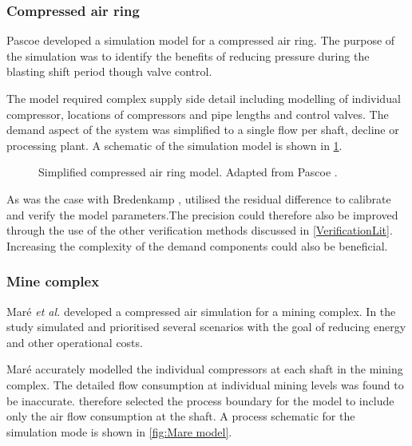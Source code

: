 \subsubsection{Compressed air ring}
Pascoe \cite{Pascoe2016Masters} developed a simulation model for a compressed air ring. The purpose of the simulation was to identify the benefits of reducing pressure during the blasting shift period though valve control.\par 
 The model required complex supply side detail including modelling of individual compressor, locations of compressors and pipe lengths and control valves. The demand aspect of the system was simplified to a single flow per shaft, decline or processing plant. A schematic of the simulation model is shown in \cref{fig:Pascoe model}.
 \par
\begin{figure}[h!]
	\centering
	\caption[Simplified compressed air ring model.]{Simplified compressed air ring model. Adapted from Pascoe \cite{Pascoe2016Masters}.}
	\label{fig:Pascoe model}
\end{figure}
As was the case with Bredenkamp \cite{Bredenkamp2013Masters}, \cite{Pascoe2016Masters} utilised the residual difference to calibrate and verify the model parameters.The precision could therefore also be improved through the use of the other verification methods discussed in \cref{VerificationLit}. Increasing the complexity of the demand components could also be beneficial.

\subsubsection{Mine complex}
Maré \textit{et al.} \cite{Mare2017Evaluating} developed a compressed air simulation for a mining complex. In the study \cite{Mare2017Evaluating} simulated and prioritised several scenarios with the goal of reducing energy and other operational costs. 
\par
 Maré accurately modelled the individual compressors at each shaft in the mining complex. The detailed flow consumption at individual mining levels was found to be inaccurate. \cite{Mare2017Evaluating} therefore selected the process boundary for the model to include only the air flow consumption at the shaft. A process schematic for the simulation mode is shown in \cref{fig:Mare model}.
 
